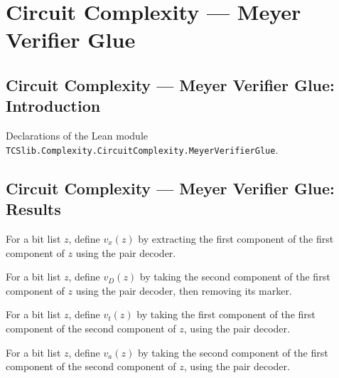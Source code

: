 \section{Circuit Complexity --- Meyer Verifier Glue}
\subsection*{Circuit Complexity --- Meyer Verifier Glue: Introduction}

Declarations of the Lean module \texttt{TCSlib.Complexity.CircuitComplexity.MeyerVerifierGlue}.

\subsection*{Circuit Complexity --- Meyer Verifier Glue: Results}

\begin{definition}
\label{Complexity.Meyer.vx}
\leanok
{}
For a bit list $z$, define $v_x(z)$ by extracting the first component of the first
component of $z$ using the pair decoder.
\end{definition}

\begin{definition}
\label{Complexity.Meyer.vD}
\leanok
{}
For a bit list $z$, define $v_D(z)$ by taking the second component of the first
component of $z$ using the pair decoder, then removing its marker.
\end{definition}

\begin{definition}
\label{Complexity.Meyer.vt}
\leanok
{}
For a bit list $z$, define $v_t(z)$ by taking the first component of the first component
of the second component of $z$, using the pair decoder.
\end{definition}

\begin{definition}
\label{Complexity.Meyer.va}
\leanok
{}
For a bit list $z$, define $v_a(z)$ by taking the second component of the first
component of the second component of $z$, using the pair decoder.
\end{definition}

